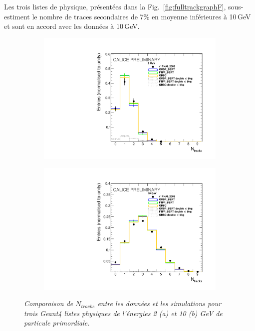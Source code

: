 Les trois listes de physique, présentées dans la Fig.~\ref{fig:fulltrackgraphF}, sous-estiment le nombre de traces secondaires de 7\% en moyenne inférieures à 10\,GeV et sont en accord avec les données à 10\,GeV.
\begin{figure}
	\centering
	\begin{subfigure}{0.5\textwidth}
		\centering
		\includegraphics[width=.90\linewidth]{ECAL/plots/ntracks-2.pdf}
		\caption{\label{fig:tr2F} }
	\end{subfigure}%
	\begin{subfigure}{0.5\textwidth}
		\centering
		\includegraphics[width=.90\linewidth]{ECAL/plots/ntracks-10.pdf}
		\caption{\label{fig:tr10F} }
	\end{subfigure}
	\caption{\label{fig:NtrackF} \sl Comparaison de $N_{tracks}$ entre les données et les simulations pour trois {\sc Geant}4  listes physiques de l'\'energies 2 (a) et 10 (b) GeV de particule primordiale.}
\end{figure}

